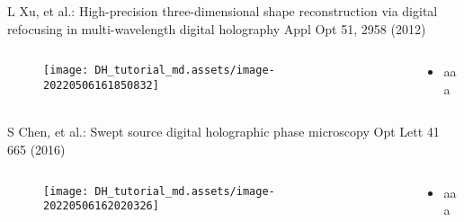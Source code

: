 \documentclass[t, aspectratio=169]{beamer}
\begin{document}


\begin{frame}{L Xu, et al.: High-precision three-dimensional shape reconstruction via digital refocusing in multi-wavelength digital holography}
	\vspace{-3 mm}
	\small Appl Opt 51, 2958 (2012)
	\begin{columns}
		\begin{column}{.6\textwidth}
			\begin{figure}
				\texttt{[image: DH\_tutorial\_md.assets/image-20220506161850832]}
			\end{figure}
		\end{column}
		\begin{column}{.4\textwidth}
			\begin{itemize}
				\item aaa
			\end{itemize}
		\end{column}
	\end{columns}
\end{frame}




\begin{frame}{S Chen, et al.: Swept source digital holographic phase microscopy}
	\vspace{-3 mm}
	\small Opt Lett 41 665 (2016)
	\begin{columns}
		\begin{column}{.6\textwidth}
			\begin{figure}
				\texttt{[image: DH\_tutorial\_md.assets/image-20220506162020326]}
			\end{figure}
		\end{column}
		\begin{column}{.4\textwidth}
			\begin{itemize}
				\item aaa
			\end{itemize}
		\end{column}
	\end{columns}
\end{frame}
\end{document}
